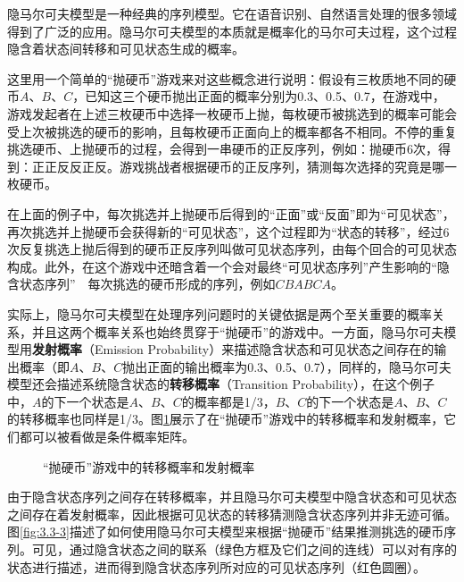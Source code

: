 \parinterval 隐马尔可夫模型是一种经典的序列模型。它在语音识别、自然语言处理的很多领域得到了广泛的应用。隐马尔可夫模型的本质就是概率化的马尔可夫过程，这个过程隐含着状态间转移和可见状态生成的概率。

\parinterval 这里用一个简单的“抛硬币”游戏来对这些概念进行说明：假设有三枚质地不同的硬币$A$、$B$、$C$，已知这三个硬币抛出正面的概率分别为0.3、0.5、0.7，在游戏中，游戏发起者在上述三枚硬币中选择一枚硬币上抛，每枚硬币被挑选到的概率可能会受上次被挑选的硬币的影响，且每枚硬币正面向上的概率都各不相同。不停的重复挑选硬币、上抛硬币的过程，会得到一串硬币的正反序列，例如：抛硬币6次，得到：正正反反正反。游戏挑战者根据硬币的正反序列，猜测每次选择的究竟是哪一枚硬币。

\parinterval 在上面的例子中，每次挑选并上抛硬币后得到的“正面”或“反面”即为“可见状态”，再次挑选并上抛硬币会获得新的“可见状态”，这个过程即为“状态的转移”，经过6次反复挑选上抛后得到的硬币正反序列叫做可见状态序列，由每个回合的可见状态构成。此外，在这个游戏中还暗含着一个会对最终“可见状态序列”产生影响的“隐含状态序列”\ \dash \ 每次挑选的硬币形成的序列，例如$CBABCA$。

\parinterval 实际上，隐马尔可夫模型在处理序列问题时的关键依据是两个至关重要的概率关系，并且这两个概率关系也始终贯穿于“抛硬币”的游戏中。一方面，隐马尔可夫模型用{\small\sffamily\bfseries{发射概率}}（Emission Probability）来描述隐含状态和可见状态之间存在的输出概率（即$A$、$B$、$C$抛出正面的输出概率为0.3、0.5、0.7），同样的，隐马尔可夫模型还会描述系统隐含状态的{\small\sffamily\bfseries{转移概率}}（Transition Probability），在这个例子中，$A$的下一个状态是$A$、$B$、$C$的概率都是1/3，$B$、$C$的下一个状态是$A$、$B$、$C$的转移概率也同样是1/3。图\ref{fig:3.3-2}展示了在“抛硬币”游戏中的转移概率和发射概率，它们都可以被看做是条件概率矩阵。

\begin{figure}[htp]
\centering

\caption{“抛硬币”游戏中的转移概率和发射概率}
\label{fig:3.3-2}
\end{figure}

\parinterval 由于隐含状态序列之间存在转移概率，并且隐马尔可夫模型中隐含状态和可见状态之间存在着发射概率，因此根据可见状态的转移猜测隐含状态序列并非无迹可循。图\ref{fig:3.3-3}描述了如何使用隐马尔可夫模型来根据“抛硬币”结果推测挑选的硬币序列。可见，通过隐含状态之间的联系（绿色方框及它们之间的连线）可以对有序的状态进行描述，进而得到隐含状态序列所对应的可见状态序列（红色圆圈）。

